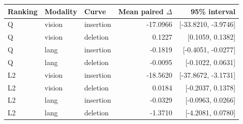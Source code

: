 \begin{tabular}{lllrr}
\toprule
Ranking & Modality & Curve & Mean paired $\Delta$ & 95\% interval \\
\midrule
Q & vision & insertion & -17.0966 & [-33.8210, -3.9746] \\
Q & vision & deletion & 0.1227 & [0.1059, 0.1382] \\
Q & lang & insertion & -0.1819 & [-0.4051, -0.0277] \\
Q & lang & deletion & -0.0095 & [-0.1022, 0.0631] \\
L2 & vision & insertion & -18.5620 & [-37.8672, -3.1731] \\
L2 & vision & deletion & 0.0184 & [-0.2037, 0.1378] \\
L2 & lang & insertion & -0.0329 & [-0.0963, 0.0266] \\
L2 & lang & deletion & -1.3710 & [-4.2081, 0.0780] \\
\bottomrule
\end{tabular}
